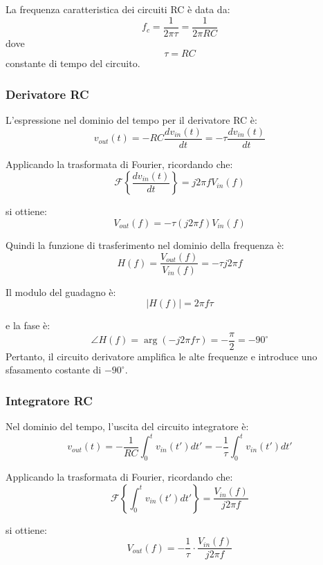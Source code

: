 \documentclass[a4paper,12pt]{article}
\begin{document}
La frequenza caratteristica dei circuiti RC è data da:
\begin{equation}
  \label{eq: freqenza_carr}
    f_c = \frac{1}{2\pi \tau} = \frac{1}{2\pi RC}
\end{equation}
dove 
\begin{equation}
  \label{eq: tau}
  \tau = RC  
\end{equation}
constante di tempo del circuito.


\subsubsection*{Derivatore RC}
L’espressione nel dominio del tempo per il derivatore RC è:
\[
v_{out}(t) = -RC \frac{d v_{in}(t)}{dt} = -\tau \frac{d v_{in}(t)}{dt}
\]

Applicando la trasformata di Fourier, ricordando che:
\[
\mathcal{F}\left\{ \frac{d v_{in}(t)}{dt} \right\} = j 2 \pi f V_{in}(f)
\]

si ottiene:
\[
V_{out}(f) = -\tau (j 2 \pi f) V_{in}(f)
\]

Quindi la funzione di trasferimento nel dominio della frequenza è:
\[
H(f) = \frac{V_{out}(f)}{V_{in}(f)} = -\tau j 2 \pi f
\]

Il modulo del guadagno è:
\begin{equation}
  \label{eq:guadagno_der}
  |H(f)| = 2 \pi f \tau
\end{equation}

e la fase è:
\[
\angle H(f) = \arg(-j 2 \pi f \tau) = -\frac{\pi}{2} = -90^\circ
\]
Pertanto, il circuito derivatore amplifica le alte frequenze e introduce uno sfasamento costante di \(-90^\circ\).

\subsubsection*{Integratore RC}

Nel dominio del tempo, l’uscita del circuito integratore è:
\begin{equation}
  \label{eq:integratore}
  v_{out}(t) = -\frac{1}{RC} \int_0^t v_{in}(t') dt' = -\frac{1}{\tau} \int_0^t v_{in}(t') dt'
\end{equation}

Applicando la trasformata di Fourier, ricordando che:
\[
\mathcal{F}\left\{ \int_0^t v_{in}(t') dt' \right\} = \frac{V_{in}(f)}{j 2 \pi f}
\]

si ottiene:
\[
V_{out}(f) = -\frac{1}{\tau} \cdot \frac{V_{in}(f)}{j 2 \pi f}
\]
\end{document}
